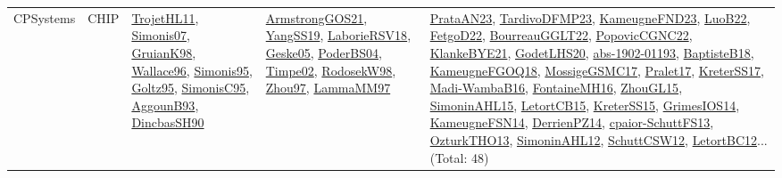 {\begin{longtable}{lp{3cm}>{\raggedright}p{6cm}>{\raggedright}p{6cm}p{8cm}}
CPSystems & CHIP & \href{articles/TrojetHL11.pdf}{TrojetHL11}\cite{TrojetHL11}, \href{articles/Simonis07.pdf}{Simonis07}\cite{Simonis07}, \href{papers/GruianK98.pdf}{GruianK98}\cite{GruianK98}, \href{articles/Wallace96.pdf}{Wallace96}\cite{Wallace96}, \href{papers/Simonis95.pdf}{Simonis95}\cite{Simonis95}, \href{papers/Goltz95.pdf}{Goltz95}\cite{Goltz95}, \href{papers/SimonisC95.pdf}{SimonisC95}\cite{SimonisC95}, \href{articles/AggounB93.pdf}{AggounB93}\cite{AggounB93}, \href{articles/DincbasSH90.pdf}{DincbasSH90}\cite{DincbasSH90} & \href{papers/ArmstrongGOS21.pdf}{ArmstrongGOS21}\cite{ArmstrongGOS21}, \href{papers/YangSS19.pdf}{YangSS19}\cite{YangSS19}, \href{articles/LaborieRSV18.pdf}{LaborieRSV18}\cite{LaborieRSV18}, \href{papers/Geske05.pdf}{Geske05}\cite{Geske05}, \href{articles/PoderBS04.pdf}{PoderBS04}\cite{PoderBS04}, \href{articles/Timpe02.pdf}{Timpe02}\cite{Timpe02}, \href{papers/RodosekW98.pdf}{RodosekW98}\cite{RodosekW98}, \href{articles/Zhou97.pdf}{Zhou97}\cite{Zhou97}, \href{articles/LammaMM97.pdf}{LammaMM97}\cite{LammaMM97} & \href{articles/PrataAN23.pdf}{PrataAN23}\cite{PrataAN23}, \href{papers/TardivoDFMP23.pdf}{TardivoDFMP23}\cite{TardivoDFMP23}, \href{papers/KameugneFND23.pdf}{KameugneFND23}\cite{KameugneFND23}, \href{papers/LuoB22.pdf}{LuoB22}\cite{LuoB22}, \href{articles/FetgoD22.pdf}{FetgoD22}\cite{FetgoD22}, \href{articles/BourreauGGLT22.pdf}{BourreauGGLT22}\cite{BourreauGGLT22}, \href{papers/PopovicCGNC22.pdf}{PopovicCGNC22}\cite{PopovicCGNC22}, \href{papers/KlankeBYE21.pdf}{KlankeBYE21}\cite{KlankeBYE21}, \href{papers/GodetLHS20.pdf}{GodetLHS20}\cite{GodetLHS20}, \href{articles/abs-1902-01193.pdf}{abs-1902-01193}\cite{abs-1902-01193}, \href{articles/BaptisteB18.pdf}{BaptisteB18}\cite{BaptisteB18}, \href{papers/KameugneFGOQ18.pdf}{KameugneFGOQ18}\cite{KameugneFGOQ18}, \href{papers/MossigeGSMC17.pdf}{MossigeGSMC17}\cite{MossigeGSMC17}, \href{papers/Pralet17.pdf}{Pralet17}\cite{Pralet17}, \href{articles/KreterSS17.pdf}{KreterSS17}\cite{KreterSS17}, \href{papers/Madi-WambaB16.pdf}{Madi-WambaB16}\cite{Madi-WambaB16}, \href{papers/FontaineMH16.pdf}{FontaineMH16}\cite{FontaineMH16}, \href{papers/ZhouGL15.pdf}{ZhouGL15}\cite{ZhouGL15}, \href{articles/SimoninAHL15.pdf}{SimoninAHL15}\cite{SimoninAHL15}, \href{articles/LetortCB15.pdf}{LetortCB15}\cite{LetortCB15}, \href{papers/KreterSS15.pdf}{KreterSS15}\cite{KreterSS15}, \href{articles/GrimesIOS14.pdf}{GrimesIOS14}\cite{GrimesIOS14}, \href{articles/KameugneFSN14.pdf}{KameugneFSN14}\cite{KameugneFSN14}, \href{papers/DerrienPZ14.pdf}{DerrienPZ14}\cite{DerrienPZ14}, \href{papers/cpaior-SchuttFS13.pdf}{cpaior-SchuttFS13}\cite{cpaior-SchuttFS13}, \href{articles/OzturkTHO13.pdf}{OzturkTHO13}\cite{OzturkTHO13}, \href{papers/SimoninAHL12.pdf}{SimoninAHL12}\cite{SimoninAHL12}, \href{papers/SchuttCSW12.pdf}{SchuttCSW12}\cite{SchuttCSW12}, \href{papers/LetortBC12.pdf}{LetortBC12}\cite{LetortBC12}... (Total: 48)\\

\end{longtable}}
